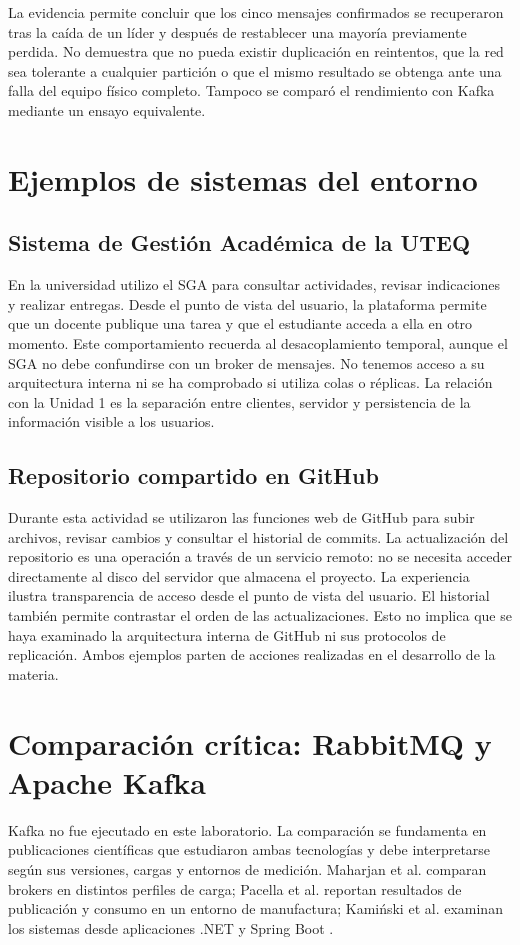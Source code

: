 \documentclass[12pt,a4paper]{article}
\begin{document}
La evidencia permite concluir que los cinco mensajes confirmados se recuperaron tras la caída de un líder y después de restablecer una mayoría previamente perdida. No demuestra que no pueda existir duplicación en reintentos, que la red sea tolerante a cualquier partición o que el mismo resultado se obtenga ante una falla del equipo físico completo. Tampoco se comparó el rendimiento con Kafka mediante un ensayo equivalente.

\section{Ejemplos de sistemas del entorno}
\subsection{Sistema de Gestión Académica de la UTEQ}
En la universidad utilizo el SGA para consultar actividades, revisar indicaciones y realizar entregas. Desde el punto de vista del usuario, la plataforma permite que un docente publique una tarea y que el estudiante acceda a ella en otro momento. Este comportamiento recuerda al desacoplamiento temporal, aunque el SGA no debe confundirse con un broker de mensajes. No tenemos acceso a su arquitectura interna ni se ha comprobado si utiliza colas o réplicas. La relación con la Unidad 1 es la separación entre clientes, servidor y persistencia de la información visible a los usuarios.

\subsection{Repositorio compartido en GitHub}
Durante esta actividad se utilizaron las funciones web de GitHub para subir archivos, revisar cambios y consultar el historial de commits. La actualización del repositorio es una operación a través de un servicio remoto: no se necesita acceder directamente al disco del servidor que almacena el proyecto. La experiencia ilustra transparencia de acceso desde el punto de vista del usuario. El historial también permite contrastar el orden de las actualizaciones. Esto no implica que se haya examinado la arquitectura interna de GitHub ni sus protocolos de replicación. Ambos ejemplos parten de acciones realizadas en el desarrollo de la materia.

\section{Comparación crítica: RabbitMQ y Apache Kafka}
Kafka no fue ejecutado en este laboratorio. La comparación se fundamenta en publicaciones científicas que estudiaron ambas tecnologías y debe interpretarse según sus versiones, cargas y entornos de medición. Maharjan et al. comparan brokers en distintos perfiles de carga; Pacella et al. reportan resultados de publicación y consumo en un entorno de manufactura; Kamiński et al. examinan los sistemas desde aplicaciones .NET y Spring Boot \cite{Maharjan2023,Pacella2025,Kaminski2025}.
\end{document}
